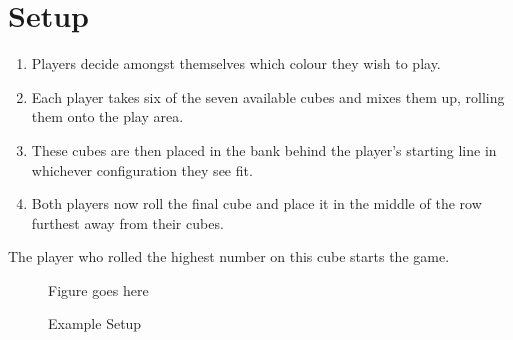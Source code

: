 \section{Setup}
\begin{enumerate}
    \item Players decide amongst themselves which colour they wish to play.
    \item Each player takes six of the seven available cubes and mixes them up, rolling them onto the play area.
    \item These cubes are then placed in the bank behind the player's starting line in whichever configuration they see fit.
    \item Both players now roll the final cube and place it in the middle of the row furthest away from their cubes.
\end{enumerate}
The player who rolled the highest number on this cube starts the game.

\begin{figure}[!h]
    \centering
    Figure goes here
    \caption{Example Setup}
    \label{fig:setup}
\end{figure}